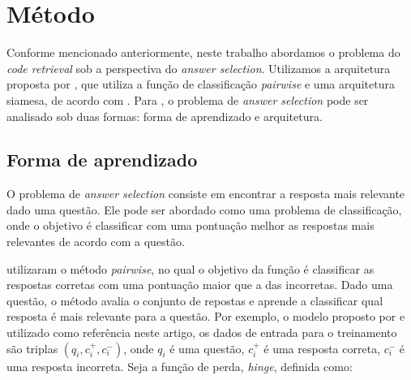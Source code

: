\documentclass[12pt]{article}
\begin{document}






\section{Método} \label{sec:metodo}

Conforme mencionado anteriormente, neste trabalho abordamos o problema do \textit{code retrieval} sob a perspectiva do \textit{answer selection}. Utilizamos 
a arquitetura proposta por \cite{tan-lstm-qa}, que utiliza a função de classificação \textit{pairwise} e uma arquitetura siamesa, de acordo com \cite{lai-etal-2018-review}. Para 
\cite{lai-etal-2018-review}, o problema de \textit{answer selection} pode ser analisado sob duas formas: forma de aprendizado e arquitetura.

\subsection{Forma de aprendizado}

O problema de \textit{answer selection} consiste em encontrar a resposta mais relevante dado uma questão. Ele pode ser abordado como uma problema de classificação, onde
o objetivo é classificar com uma pontuação melhor as respostas mais relevantes de acordo com a questão.

\cite{tan-lstm-qa} utilizaram o método \textit{pairwise}, no qual o objetivo da função é classificar as respostas corretas com uma pontuação maior que a das incorretas. Dado uma questão,
o método avalia o conjunto de repostas e aprende a classificar qual resposta é mais relevante para a questão. Por exemplo, o modelo proposto por \cite{tan-lstm-qa} e utilizado como referência neste artigo, os dados de entrada para o treinamento
são triplas $(q_{i}, c_{i}^{+}, c_{i}^{-})$, onde $q_{i}$ é uma questão, $c_{i}^{+}$ é uma resposta correta, $c_{i}^{-}$ é uma resposta incorreta. Seja a função de perda, \textit{hinge}, definida como:
\end{document}
